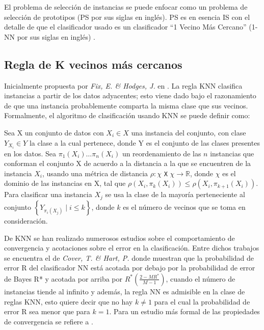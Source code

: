 El problema de selección de instancias se puede enfocar como un problema de selección de prototipos (PS por sus siglas en inglés). PS es en esencia IS con el detalle de que el clasificador usado es un clasificador ``1 Vecino Más Cercano'' (1-NN por sus siglas en inglés) \cite{garcia2016data}.

\subsection{Regla de K vecinos más cercanos}

Inicialmente propuesta por \emph{Fix, E. \& Hodges, J.} en \cite{fix1951discriminatory}. La regla KNN clasifica instancias a partir de los datos adyacentes; esto viene dado bajo el razonamiento de que una instancia probablemente comparta la misma clase que sus vecinos. Formalmente, el algoritmo de clasificación usando KNN se puede definir como:\\  

\begin{definicion}
Sea X un conjunto de datos con $X_i\in X$ una instancia del conjunto, con clase $Y_{X_i}\in Y$ la clase a la cual pertenece, donde Y es el conjunto de las clases presentes en los datos. Sea $\pi_1(X_i)\dots \pi_n(X_i)$ un reordenamiento de las $n$ instancias que conforman el conjunto X de acuerdo a la distancia a la que se encuentren de la instancia $X_i$, usando una métrica de distancia  $\rho:\chi$ \texttt{X} $\chi \rightarrow \mathbb{R}$, donde $\chi$ es el dominio de las instancias en X, tal que $\rho(X_i,\pi_k(X_i)) \leq \rho(X_i,\pi_{k+1}(X_i))$. Para clasificar una instancia $X_j$ se usa la clase de la mayoría perteneciente al conjunto $\left\{Y_{\pi_i(X_j)} \mid i \leq k\right\}$, donde $k$ es el número de vecinos que se toma en consideración. \cite{shalev2014understanding}
\end{definicion}

De KNN se han realizado numerosos estudios sobre el comportamiento de convergencia y acotaciones sobre el error en la clasificación. Entre dichos trabajos se encuentra el de \emph{Cover, T. \& Hart, P.} \cite{cover1967nearest} donde muestran que la probabilidad de error R del clasificador NN está acotada por debajo por la probabilidad de error de Bayes R* y acotada por arriba por $R^*(\frac{2-MR^*}{M-1})$, cuando el número de instancias tiende al infinito y además, la regla NN es admisible en la clase de reglas KNN, esto quiere decir que no hay $k\neq 1$ para el cual la probabilidad de error R sea menor que para $k=1$. Para un estudio más formal de las propiedades de convergencia se refiere a \cite{devroye2013probabilistic}.

